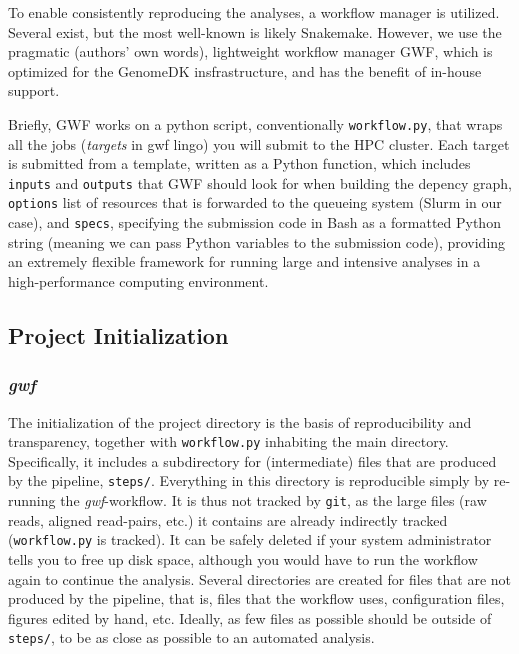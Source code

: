 \documentclass[
  11pt,
  a4paper,
]{scrbook}
\begin{document}
To enable consistently reproducing the analyses, a workflow manager is
utilized. Several exist, but the most well-known is likely Snakemake.
However, we use the pragmatic (authors' own words), lightweight workflow
manager GWF, which is optimized for the GenomeDK insfrastructure, and
has the benefit of in-house support.

Briefly, GWF works on a python script, conventionally
\texttt{workflow.py}, that wraps all the jobs (\emph{targets} in gwf
lingo) you will submit to the HPC cluster. Each target is submitted from
a template, written as a Python function, which includes \texttt{inputs}
and \texttt{outputs} that GWF should look for when building the depency
graph, \texttt{options} list of resources that is forwarded to the
queueing system (Slurm in our case), and \texttt{specs}, specifying the
submission code in Bash as a formatted Python string (meaning we can
pass Python variables to the submission code), providing an extremely
flexible framework for running large and intensive analyses in a
high-performance computing environment.

\subsection{Project Initialization}\label{project-initialization}

\subsubsection{\texorpdfstring{\emph{gwf}}{gwf}}\label{gwf}

The initialization of the project directory is the basis of
reproducibility and transparency, together with \texttt{workflow.py}
inhabiting the main directory. Specifically, it includes a subdirectory
for (intermediate) files that are produced by the pipeline,
\texttt{steps/}. Everything in this directory is reproducible simply by
re-running the \emph{gwf}-workflow. It is thus not tracked by
\texttt{git}, as the large files (raw reads, aligned read-pairs, etc.)
it contains are already indirectly tracked (\texttt{workflow.py} is
tracked). It can be safely deleted if your system administrator tells
you to free up disk space, although you would have to run the workflow
again to continue the analysis. Several directories are created for
files that are not produced by the pipeline, that is, files that the
workflow uses, configuration files, figures edited by hand, etc.
Ideally, as few files as possible should be outside of \texttt{steps/},
to be as close as possible to an automated analysis.
\end{document}
